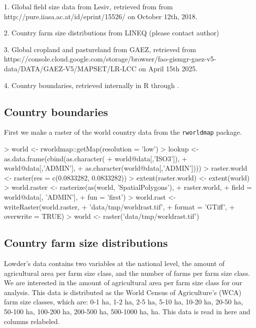 \documentclass{article}
\begin{document}
1. Global field size data from Lesiv, retrieved from from http://pure.iiasa.ac.at/id/eprint/15526/ on October 12th, 2018.

2. Country farm size distributions from LINEQ (please contact author)

3. Global cropland and pastureland from GAEZ, retrieved from https://console.cloud.google.com/storage/browser/fao-gismgr-gaez-v5-data/DATA/GAEZ-V5/MAPSET/LR-LCC on April 15th 2025.

4. Country boundaries, retrieved internally in R through \cite{R-rworldmap}.


\subsection{Country boundaries}

First we make a raster of the world country data from the \texttt{rworldmap} package.
\begin{Schunk}
\begin{Sinput}
> world  <- rworldmap::getMap(resolution = 'low')
> lookup <- as.data.frame(cbind(as.character(
+   world@data[,'ISO3']),
+   world@data[,'ADMIN'],
+   as.character(world@data[,'ADMIN'])))
> raster.world <- raster(res = c(0.0833282, 0.0833282))
> extent(raster.world) <- extent(world)
> world.raster <- rasterize(as(world, 'SpatialPolygons'),
+                           raster.world,
+                           field = world@data[, 'ADMIN'],
+                           fun   = 'first')
> world.rast <- writeRaster(world.raster,
+                           'data/tmp/worldrast.tif',
+                           format    = 'GTiff',
+                           overwrite = TRUE)
> world  <- raster('data/tmp/worldrast.tif')
\end{Sinput}
\end{Schunk}

\subsection{Country farm size distributions}

Lowder's data contains two variables at the national level, the amount of agricultural area per farm size class, and the number of farms per farm size class. We are interested in the amount of agricultural area per farm size class for our analysis. This data is distributed as the World Census of Agriculture's (WCA) farm size classes, which are: 0-1 ha, 1-2 ha, 2-5 ha, 5-10 ha, 10-20 ha, 20-50 ha, 50-100 ha, 100-200 ha, 200-500 ha, 500-1000 ha,  ha. This data is read in here and columns relabeled.
\end{document}
